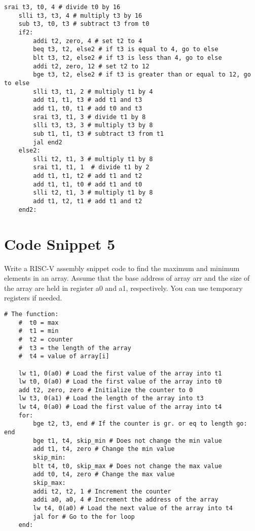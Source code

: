 \documentclass[12pt]{article}
\begin{document}
    \begin{lstlisting}[language=RISCV]
        srai t3, t0, 4 # divide t0 by 16
    slli t3, t3, 4 # multiply t3 by 16
    sub t3, t0, t3 # subtract t3 from t0
    if2:
        addi t2, zero, 4 # set t2 to 4
        beq t3, t2, else2 # if t3 is equal to 4, go to else
        blt t3, t2, else2 # if t3 is less than 4, go to else
        addi t2, zero, 12 # set t2 to 12
        bge t3, t2, else2 # if t3 is greater than or equal to 12, go to else
        slli t3, t1, 2 # multiply t1 by 4
        add t1, t1, t3 # add t1 and t3
        add t1, t0, t1 # add t0 and t3
        srai t3, t1, 3 # divide t1 by 8
        slli t3, t3, 3 # multiply t3 by 8
        sub t1, t1, t3 # subtract t3 from t1
        jal end2
    else2:
        slli t2, t1, 3 # multiply t1 by 8
        srai t1, t1, 1  # divide t1 by 2
        add t1, t1, t2 # add t1 and t2
        add t1, t1, t0 # add t1 and t0
        slli t2, t1, 3 # multiply t1 by 8
        add t1, t2, t1 # add t1 and t2
    end2:
    \end{lstlisting}

    \newpage
    \section{Code Snippet 5}
    \begin{flushleft}
        Write a RISC-V assembly snippet code to find the maximum and minimum
        elements in an array. Assume that the base address of array arr and the size of the array
        are held in register a0 and a1, respectively. You can use temporary registers if needed.
    \end{flushleft}
    \begin{lstlisting}[language=RISCV]
    # The function:
    #  t0 = max
    #  t1 = min
    #  t2 = counter
    #  t3 = the length of the array
    #  t4 = value of array[i]
            
    lw t1, 0(a0) # Load the first value of the array into t1
    lw t0, 0(a0) # Load the first value of the array into t0
    add t2, zero, zero # Initialize the counter to 0
    lw t3, 0(a1) # Load the length of the array into t3
    lw t4, 0(a0) # Load the first value of the array into t4
    for:
        bge t2, t3, end # If the counter is gr. or eq to length go: end
        bge t1, t4, skip_min # Does not change the min value
        add t1, t4, zero # Change the min value
        skip_min:
        blt t4, t0, skip_max # Does not change the max value
        add t0, t4, zero # Change the max value
        skip_max:
        addi t2, t2, 1 # Increment the counter
        addi a0, a0, 4 # Increment the address of the array
        lw t4, 0(a0) # Load the next value of the array into t4
        jal for # Go to the for loop
    end:
    \end{lstlisting}
\end{document}
